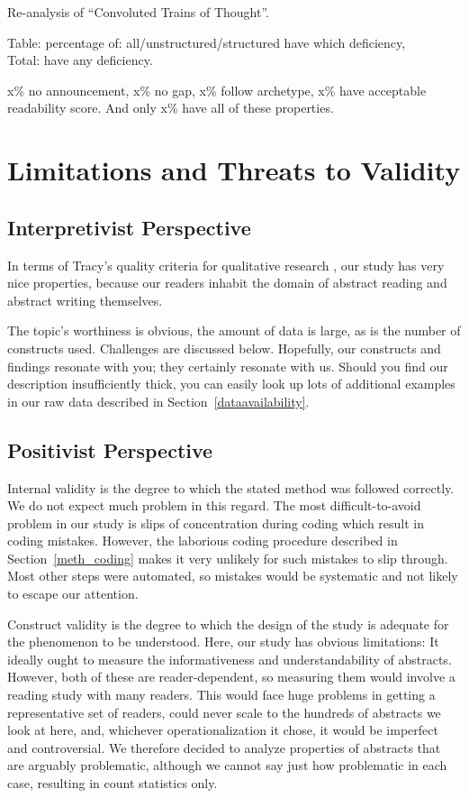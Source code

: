 \documentclass[10pt,journal,compsoc]{IEEEtran}
\begin{document}
Re-analysis of ``Convoluted Trains of Thought''.

Table: percentage of: all/unstructured/structured have which deficiency,\\
Total: have any deficiency.

x\% no announcement, x\% no gap, x\% follow archetype, x\% have acceptable readability score.
And only x\% have all of these properties.




\section{Limitations and Threats to Validity}

\subsection{Interpretivist Perspective}

In terms of Tracy's quality criteria for qualitative research \cite{Tracy10},
our study has very nice properties, because our readers inhabit
the domain of abstract reading and abstract writing themselves.

The topic's worthiness is obvious, the amount of data is large,
as is the number of constructs used.
Challenges are discussed below.
Hopefully, our constructs and findings resonate with you;
they certainly resonate with us.
Should you find our description insufficiently thick,
you can easily look up lots of additional examples in our raw data
described in Section~\ref{dataavailability}.


\subsection{Positivist Perspective}

Internal validity is the degree to which the stated method
was followed correctly.
We do not expect much problem in this regard.
The most difficult-to-avoid problem in our study is slips of concentration
during coding which result in coding mistakes.
However, the laborious coding procedure
described in Section~\ref{meth_coding}
makes it very unlikely for such mistakes to slip through.
Most other steps were automated, so mistakes would be systematic
and not likely to escape our attention.

Construct validity is the degree to which the design
of the study is adequate for the phenomenon to be understood.
Here, our study has obvious limitations:
It ideally ought to measure the informativeness and understandability of
abstracts. However, both of these are reader-dependent, so
measuring them would involve a reading study with many readers.
This would face huge problems in getting a representative set of readers,
could never scale to the hundreds of abstracts we look at here,
and, whichever operationalization it chose,
it would be imperfect and controversial.
We therefore decided to analyze properties of abstracts
that are arguably problematic, although we cannot say just how
problematic in each case, resulting in count statistics only.
\end{document}
